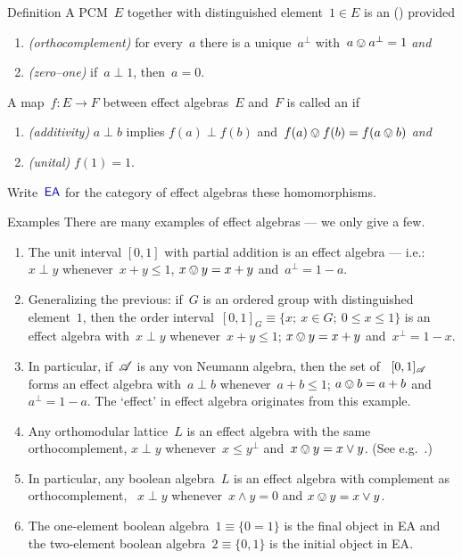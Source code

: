 \documentclass[b]{subfiles}
\begin{document}
\begin{parsec}%
\begin{point}[dfn-ea]{Definition}%
A PCM~$E$ together with distinguished element~$1 \in E$
is an  () \cite{ea}
    provided
\begin{enumerate}
\item
    \emph{(orthocomplement)}
    for every~$a$
    there is a unique~$a^\perp$
   with~$a \ovee a^\perp = 1$ \emph{and}
\item
    \emph{(zero--one)}
    if~$a \perp 1$, then~$a = 0$.
\end{enumerate}
A map~$f\colon E \to F$
between effect algebras~$E$ and~$F$
is called an 
if
\begin{enumerate}
    \item \emph{(additivity)}
    $a \perp b$ implies $f(a) \perp f(b)$ and~$f(a)\ovee f(b) = f(a\ovee b)$
        \emph{and}
    \item \emph{(unital)}
    $f(1) = 1$.
\end{enumerate}
Write~$\Define{\textsf{EA}}$ for the category
    of effect algebras these homomorphisms.
\end{point}
\begin{point}{Examples}%
There are many examples of effect algebras
    --- we only give a few.
\begin{enumerate}
\item
The unit interval
$[0,1]$ with partial addition is an effect algebra ---
i.e.:~$x \perp y$
        whenever~$x +y \leq 1$, $x \ovee y = x + y$
        and~$a^\perp = 1-a$.
\item
Generalizing the previous:
if~$G$ is an ordered group
with distinguished element~$1$,
then the order interval~$[0,1]_G \equiv \{x;\ x\in G;\ 0 \leq x\leq 1\}$
is an effect algebra
with~$x \perp y$ whenever~$x +y \leq 1$;
$x \ovee y = x + y$ and~$x^\perp = 1-x$.
\item
In particular,
    if~$\mathscr{A}$ is any von Neumann algebra,
    then the set of ~$[0,1]_{\mathscr{A}}$
    forms an effect algebra
    with~$a \perp b$ whenever~$a +b \leq 1$;
    $a \ovee b = a + b$ and~$a^\perp = 1-a$.
The `effect' in effect algebra originates from this example.
\item
Any orthomodular lattice~$L$
    is an effect algebra
    with the same orthocomplement,
    $x \perp y$ whenever~$x \leq y^\perp$
    and~$x \ovee y = x \vee y$.  (See e.g.~\cite[Prop.~27]{basmsc}.)
\item
In particular,
    any boolean algebra~$L$
    is an effect algebra
    with complement as orthocomplement,
    ~$x \perp y$ whenever~$x \wedge y = 0$ and
    $x \ovee y = x \vee y $.
\item
The one-element boolean algebra~$1 \equiv \{0=1\}$
    is the final object in \textsf{EA}
    and the two-element boolean algebra~$2 \equiv \{0,1\}$
    is the initial object in \textsf{EA}.
\end{enumerate}
\end{point}


\end{parsec}
\end{document}

